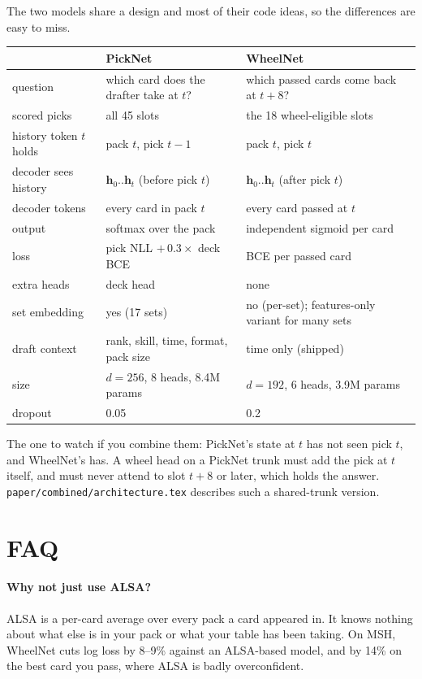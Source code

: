 \documentclass[11pt,letterpaper]{article}
\newcommand{\code}[1]{\texttt{\small #1}}
\begin{document}
The two models share a design and most of their code ideas, so the differences are easy to miss.

\begin{center}\small
\begin{tabular}{>{\raggedright}p{3.4cm}>{\raggedright}p{5.2cm}p{5.2cm}}
\toprule
 & PickNet & WheelNet \\
\midrule
question & which card does the drafter take at $t$? & which passed cards come back at $t+8$? \\
scored picks & all 45 slots & the 18 wheel-eligible slots \\
history token $t$ holds & pack $t$, pick $t-1$ & pack $t$, pick $t$ \\
decoder sees history & $\mathbf h_0..\mathbf h_t$ (before pick $t$) & $\mathbf h_0..\mathbf h_t$ (after pick $t$) \\
decoder tokens & every card in pack $t$ & every card passed at $t$ \\
output & softmax over the pack & independent sigmoid per card \\
loss & pick NLL $+\,0.3\times$ deck BCE & BCE per passed card \\
extra heads & deck head & none \\
set embedding & yes (17 sets) & no (per-set); features-only variant for many sets \\
draft context & rank, skill, time, format, pack size & time only (shipped) \\
size & $d=256$, 8 heads, 8.4M params & $d=192$, 6 heads, 3.9M params \\
dropout & 0.05 & 0.2 \\
\bottomrule
\end{tabular}
\end{center}

\noindent The one to watch if you combine them: PickNet's state at $t$ has not seen pick $t$, and
WheelNet's has. A wheel head on a PickNet trunk must add the pick at $t$ itself, and must never attend to slot
$t+8$ or later, which holds the answer. \code{paper/combined/architecture.tex} describes such a shared-trunk version.

\section{FAQ}

\paragraph{Why not just use ALSA?} ALSA is a per-card average over every pack a card appeared in. It knows
nothing about what else is in your pack or what your table has been taking. On MSH, WheelNet cuts log loss by
8--9\% against an ALSA-based model, and by 14\% on the best card you pass, where ALSA is badly overconfident.
\end{document}
